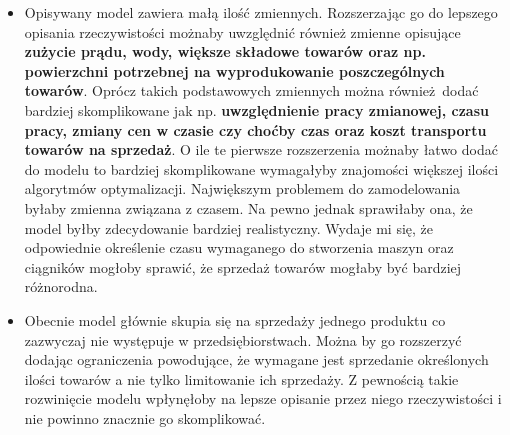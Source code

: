 \documentclass{article}
\begin{document}
\begin{itemize}
  \item Opisywany model zawiera małą ilość zmiennych. Rozszerzając go do lepszego opisania rzeczywistości możnaby uwzględnić również zmienne opisujące \textbf{zużycie prądu, wody, większe składowe towarów oraz np. powierzchni potrzebnej na wyprodukowanie poszczególnych towarów}. 
    Oprócz takich podstawowych zmiennych można również dodać bardziej skomplikowane jak np. \textbf{uwzględnienie pracy zmianowej, czasu pracy, zmiany cen w czasie czy choćby czas oraz koszt transportu towarów na sprzedaż}. O ile te pierwsze rozszerzenia możnaby łatwo dodać
    do modelu to bardziej skomplikowane wymagałyby znajomości większej ilości algorytmów optymalizacji. Największym problemem do zamodelowania byłaby zmienna związana z czasem. Na pewno jednak sprawiłaby ona, że model byłby zdecydowanie bardziej realistyczny. Wydaje mi się, że
    odpowiednie określenie czasu wymaganego do stworzenia maszyn oraz ciągników mogłoby sprawić, że sprzedaż towarów mogłaby być bardziej różnorodna.
  \item Obecnie model głównie skupia się na sprzedaży jednego produktu co zazwyczaj nie występuje w przedsiębiorstwach. Można by go rozszerzyć dodając ograniczenia powodujące, że wymagane jest sprzedanie określonych ilości towarów a nie tylko limitowanie ich sprzedaży. 
    Z pewnością takie rozwinięcie modelu wpłynęłoby na lepsze opisanie przez niego rzeczywistości i nie powinno znacznie go skomplikować.
\end{itemize}
\end{document}
